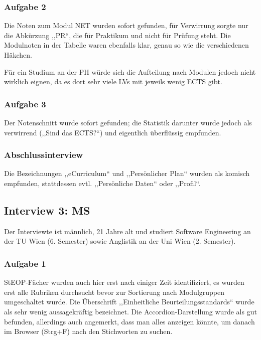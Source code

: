 \documentclass[a4paper,10pt]{scrartcl}
\begin{document}
\subsubsection*{Aufgabe 2}

Die Noten zum Modul NET wurden sofort gefunden, für Verwirrung sorgte nur die Abkürzung ,,PR``, die für Praktikum und nicht für Prüfung steht. Die Modulnoten in der Tabelle waren ebenfalls klar, genau so wie die verschiedenen Häkchen.

Für ein Studium an der PH würde sich die Aufteilung nach Modulen jedoch nicht wirklich eignen, da es dort sehr viele LVs mit jeweils wenig ECTS gibt.

\subsubsection*{Aufgabe 3}

Der Notenschnitt wurde sofort gefunden; die Statistik darunter wurde jedoch als verwirrend (,,Sind das ECTS?“) und eigentlich überflüssig empfunden.

\subsubsection*{Abschlussinterview}

Die Bezeichnungen ,,eCurriculum`` und ,,Persönlicher Plan`` wurden als komisch empfunden, stattdessen evtl. ,,Persönliche Daten`` oder ,,Profil``.

\subsection*{Interview 3: MS}

Der Interviewte ist männlich, 21 Jahre alt und studiert Software Engineering an der TU Wien (6. Semester) sowie Anglistik an der Uni Wien (2. Semester).

\subsubsection*{Aufgabe 1}

StEOP-Fächer wurden auch hier erst nach einiger Zeit identifiziert, es wurden erst alle Rubriken durchsucht bevor zur Sortierung nach Modulgruppen umgeschaltet wurde. Die Überschrift ,,Einheitliche Beurteilungsstandards`` wurde als sehr wenig aussagekräftig bezeichnet. Die Accordion-Darstellung wurde als gut befunden, allerdings auch angemerkt, dass man alles anzeigen könnte, um danach im Browser (Strg+F) nach den Stichworten zu suchen.
\end{document}
